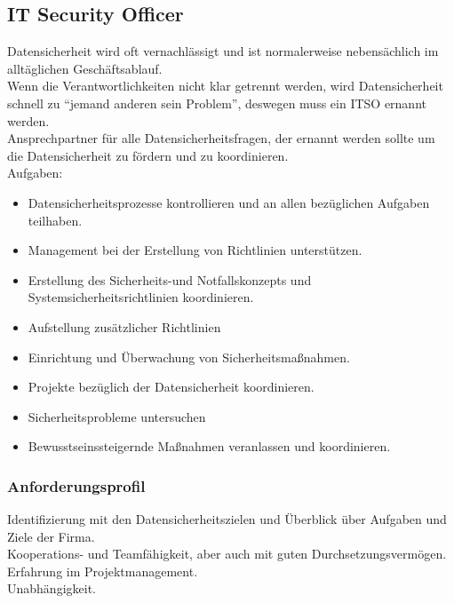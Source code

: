 \documentclass{article} %
\begin{document}
\subsection{IT Security Officer}
Datensicherheit wird oft vernachlässigt und ist normalerweise nebensächlich im alltäglichen Geschäftsablauf.\\
Wenn die Verantwortlichkeiten nicht klar getrennt werden, wird Datensicherheit schnell zu "`jemand anderen sein Problem"', deswegen muss ein ITSO ernannt werden.\\
Ansprechpartner für alle Datensicherheitsfragen, der ernannt werden sollte um die Datensicherheit zu fördern und zu koordinieren.\\
Aufgaben:
\begin{itemize}
	\item Datensicherheitsprozesse kontrollieren und an allen bezüglichen Aufgaben teilhaben.
    \item Management bei der Erstellung von Richtlinien unterstützen.
    \item Erstellung des Sicherheits-und Notfallskonzepts und Systemsicherheitsrichtlinien koordinieren.
    \item Aufstellung zusätzlicher Richtlinien
    \item Einrichtung und Überwachung von Sicherheitsmaßnahmen.
    \item Projekte bezüglich der Datensicherheit koordinieren.
    \item Sicherheitsprobleme untersuchen
    \item Bewusstseinssteigernde Maßnahmen veranlassen und koordinieren.
\end{itemize}
\subsubsection{Anforderungsprofil}
Identifizierung mit den Datensicherheitszielen und Überblick über Aufgaben und Ziele der Firma.\\
Kooperations- und Teamfähigkeit, aber auch mit guten Durchsetzungsvermögen.\\
Erfahrung im Projektmanagement.\\
Unabhängigkeit.
\end{document}
